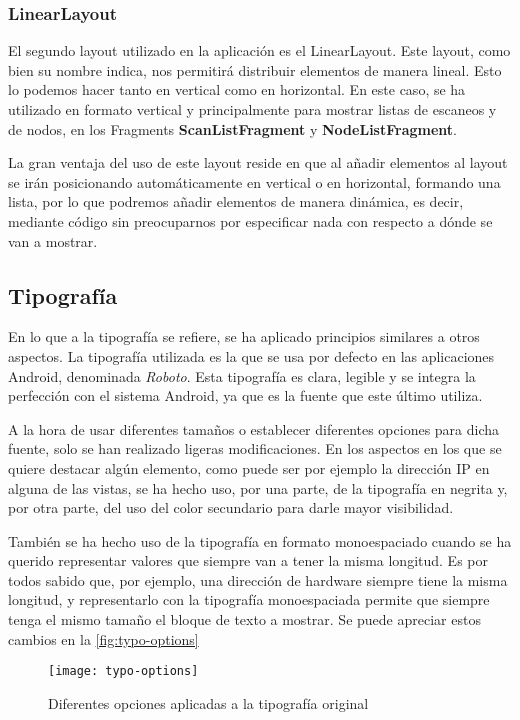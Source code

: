 \subsubsection{LinearLayout}

El segundo layout utilizado en la aplicación es el LinearLayout. Este layout, como bien su nombre indica, nos permitirá distribuir elementos de manera lineal. Esto lo podemos hacer tanto en vertical como en horizontal. En este caso, se ha utilizado en formato vertical y principalmente para mostrar listas de escaneos y de nodos, en los Fragments \textbf{ScanListFragment} y \textbf{NodeListFragment}. 

La gran ventaja del uso de este layout reside en que al añadir elementos al layout se irán posicionando automáticamente en vertical o en horizontal, formando una lista, por lo que podremos añadir elementos de manera dinámica, es decir, mediante código sin preocuparnos por especificar nada con respecto a dónde se van a mostrar.

\subsection{Tipografía}

En lo que a la tipografía se refiere, se ha aplicado principios similares a otros aspectos. La tipografía utilizada es la que se usa por defecto en las aplicaciones Android, denominada \textit{Roboto}. Esta tipografía es clara, legible y se integra la perfección con el sistema Android, ya que es la fuente que este último utiliza.

A la hora de usar diferentes tamaños o establecer diferentes opciones para dicha fuente, solo se han realizado ligeras modificaciones. En los aspectos en los que se quiere destacar algún elemento, como puede ser por ejemplo la dirección IP en alguna de las vistas, se ha hecho uso, por una parte, de la tipografía en negrita y, por otra parte, del uso del color secundario para darle mayor visibilidad.

También se ha hecho uso de la tipografía en formato monoespaciado cuando se ha querido representar valores que siempre van a tener la misma longitud. Es por todos sabido que, por ejemplo, una dirección de hardware siempre tiene la misma longitud, y representarlo con la tipografía monoespaciada permite que siempre tenga el mismo tamaño el bloque de texto a mostrar. Se puede apreciar estos cambios en la \autoref{fig:typo-options}

\begin{figure}[H]
	\centering
	\texttt{[image: typo-options]}
	\caption{Diferentes opciones aplicadas a la tipografía original}
	\label{fig:typo-options}
\end{figure}

